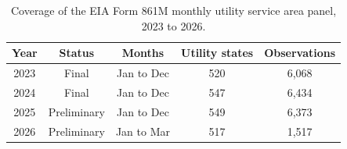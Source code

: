 \begin{table}[H]
\centering
\caption{Coverage of the EIA Form 861M monthly utility service area panel, 2023 to 2026.}
\label{tab:coverage}
\begin{tabular}{ccccc}
\toprule
Year & Status & Months & Utility states & Observations \\
\midrule
2023 & Final & Jan to Dec & 520 & 6,068 \\
2024 & Final & Jan to Dec & 547 & 6,434 \\
2025 & Preliminary & Jan to Dec & 549 & 6,373 \\
2026 & Preliminary & Jan to Mar & 517 & 1,517 \\
\bottomrule
\end{tabular}
\end{table}
